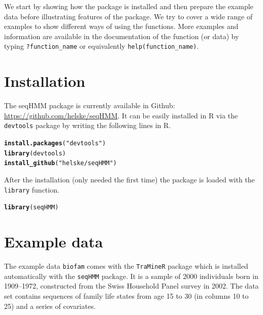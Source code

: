 \documentclass[12pt]{article}\usepackage[]{graphicx}\usepackage[]{color}
\makeatletter
\newcommand{\hlstr}[1]{\textcolor[rgb]{0.192,0.494,0.8}{#1}}%
\newcommand{\hlstd}[1]{\textcolor[rgb]{0.345,0.345,0.345}{#1}}%
\newcommand{\hlkwd}[1]{\textcolor[rgb]{0.737,0.353,0.396}{\textbf{#1}}}%
\newenvironment{kframe}{%
 \def\at@end@of@kframe{}%
 \ifinner\ifhmode%
  \def\at@end@of@kframe{\end{minipage}}%
  \begin{minipage}{\columnwidth}%
 \fi\fi%
 \def\FrameCommand##1{\hskip\@totalleftmargin \hskip-\fboxsep
 \colorbox{shadecolor}{##1}\hskip-\fboxsep
     \hskip-\linewidth \hskip-\@totalleftmargin \hskip\columnwidth}%
 \MakeFramed {\advance\hsize-\width
   \@totalleftmargin\z@ \linewidth\hsize
   \@setminipage}}%
 {\par\unskip\endMakeFramed%
 \at@end@of@kframe}
\newenvironment{knitrout}{}{} %
\makeatother
\begin{document}
We start by showing how the package is installed and then prepare the example data before illustrating features of the package. We try to cover a wide range of examples to show different ways of using the functions. More examples and information are available in the documentation of the function (or data) by typing \texttt{?function\_name} or equivalently \texttt{help(function\_name)}.


\section{Installation}

The seqHMM package is currently available in Github:
  \url{https://github.com/helske/seqHMM}.
It can be easily installed in R via the \texttt{devtools} package by writing the following lines in R.

\begin{knitrout}
\color{fgcolor}\begin{kframe}
\begin{alltt}
\hlkwd{install.packages}\hlstd{(}\hlstr{"devtools"}\hlstd{)}
\hlkwd{library}\hlstd{(devtools)}
\hlkwd{install_github}\hlstd{(}\hlstr{"helske/seqHMM"}\hlstd{)}
\end{alltt}
\end{kframe}
\end{knitrout}
After the installation (only needed the first time) the package is loaded with the \texttt{library} function.

\begin{knitrout}
\color{fgcolor}\begin{kframe}
\begin{alltt}
\hlkwd{library}\hlstd{(seqHMM)}
\end{alltt}
\end{kframe}
\end{knitrout}

\section{Example data}
\label{sec:data}

The example data \texttt{biofam} comes with the \texttt{TraMineR} package \citep{Gabadinho2011} which is installed automatically with the \texttt{seqHMM} package. It is a sample of 2000 individuals born in 1909--1972, constructed from the Swiss Household Panel survey in 2002. The data set contains sequences of family life states from age 15 to 30 (in columns 10 to 25) and a series of covariates.
\end{document}
